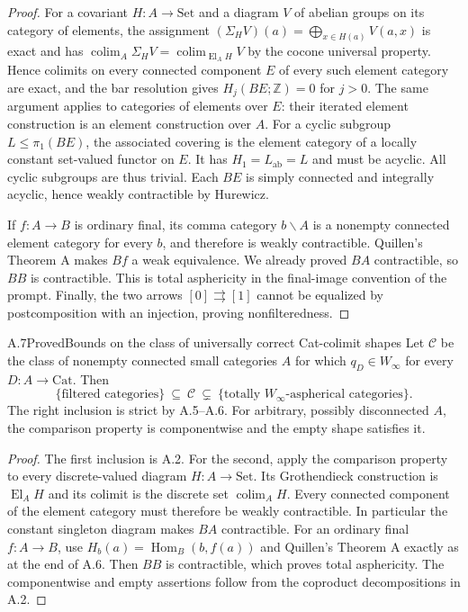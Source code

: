 \begin{proof}
For a covariant $H:A\to\mathrm{Set}$ and a diagram $V$ of abelian
groups on its category of elements, the assignment
$(\Sigma_H V)(a)=\bigoplus_{x\in H(a)}V(a,x)$ is exact and has
$\operatorname{colim}_A\Sigma_H V
 =\operatorname{colim}_{\operatorname{El}_A H}V$ by the cocone
universal property. Hence colimits on every connected component $E$
of every such element category are exact, and the bar resolution
gives $H_j(BE;\mathbb Z)=0$ for $j>0$. The same argument applies to
categories of elements over $E$: their iterated element construction
is an element construction over $A$. For a cyclic subgroup
$L\leq\pi_1(BE)$, the associated covering is the element category
of a locally constant set-valued functor on $E$. It has
$H_1=L_{\mathrm{ab}}=L$ and must be acyclic. All cyclic subgroups
are thus trivial. Each $BE$ is simply connected and integrally
acyclic, hence weakly contractible by Hurewicz.

If $f:A\to B$ is ordinary final, its comma category $b\backslash A$
is a nonempty connected element category for every $b$, and therefore
is weakly contractible. Quillen's Theorem A makes $Bf$ a weak
equivalence. We already proved $BA$ contractible, so $BB$ is
contractible. This is total asphericity in the final-image convention
of the prompt. Finally, the two arrows $[0]\rightrightarrows[1]$
cannot be equalized by postcomposition with an injection, proving
nonfilteredness.
\end{proof}

\begin{result}{A.7}{Proved}{Bounds on the class of universally correct Cat-colimit shapes}
Let $\mathcal C$ be the class of nonempty connected small categories
$A$ for which $q_D\in W_\infty$ for every $D:A\to\mathrm{Cat}$.
Then
\[
 \{\text{filtered categories}\}\ \subseteq\ \mathcal C
 \ \subsetneq\ \{\text{totally }W_\infty\text{-aspherical categories}\}.
\]
The right inclusion is strict by A.5--A.6. For arbitrary, possibly
disconnected $A$, the comparison property is componentwise and the
empty shape satisfies it.
\end{result}
\begin{proof}
The first inclusion is A.2. For the second, apply the comparison
property to every discrete-valued diagram $H:A\to\mathrm{Set}$.
Its Grothendieck construction is $\operatorname{El}_A H$ and its
colimit is the discrete set $\operatorname{colim}_A H$. Every
connected component of the element category must therefore be
weakly contractible. In particular the constant singleton diagram
makes $BA$ contractible. For an ordinary final $f:A\to B$, use
$H_b(a)=\operatorname{Hom}_B(b,f(a))$ and Quillen's Theorem A exactly
as at the end of A.6. Then $BB$ is contractible, which proves total
asphericity. The componentwise and empty assertions follow from
the coproduct decompositions in A.2.
\end{proof}

